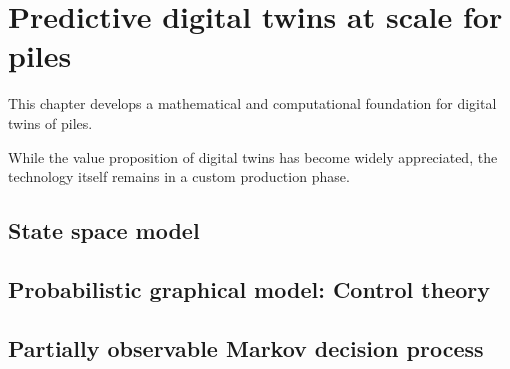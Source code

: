 

\chapter{Predictive digital twins at scale for piles}
\label{DT}

This chapter develops a mathematical and computational foundation for digital twins of piles.

While the value proposition of digital twins has become widely appreciated, the technology itself remains in a custom production phase.



\section{State space model}



\section{Probabilistic graphical model: Control theory }




\section{Partially observable Markov decision process}

